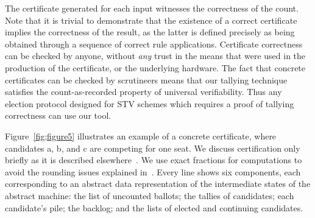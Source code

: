 \documentclass{llncs}
\begin{document}
The certificate generated for each input witnesses 
the correctness of the
count. Note that it is trivial to demonstrate that the existence of
a correct certificate implies the correctness of the result, as the
latter is defined precisely as being obtained through a sequence of
correct rule applications. 
Certificate correctness can be checked by anyone, without \emph{any}
trust in the means that were used in the production of the
certificate, or the underlying hardware. 
The fact that concrete certificates can be checked by scrutineers
means that 
our tallying technique satisfies the
count-as-recorded property of universal verifiability. Thus any
election protocol designed for STV schemes which requires a proof of
tallying correctness can use our tool.

 Figure~\ref{fig;figure5} illustrates an example of a concrete
 certificate, where candidates a, b, and c are competing for one
 seat. We discuss certification only briefly as it is described elsewhere~\cite{Ghale:2017:FVS}.
 We use exact fractions for
 computations to avoid the rounding issues explained
 in~\cite{DBLP:conf/voteid/GoreL16}.
 Every line shows six components, each 
 corresponding to an abstract data representation of the intermediate
 states of the abstract  machine: the 
 list of uncounted ballots; the tallies of candidates; each
 candidate's pile; the backlog; and the lists of elected and
 continuing candidates. 
 
\end{document}
